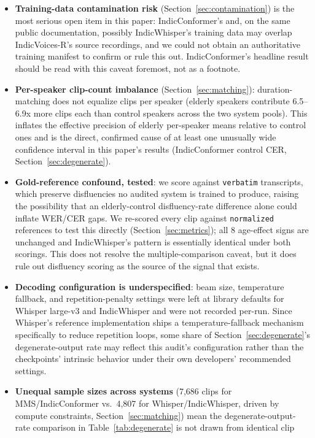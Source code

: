 \documentclass[11pt]{article}
\begin{document}
\begin{itemize}
\item \textbf{Training-data contamination risk} (Section~\ref{sec:contamination}) is the most
serious open item in this paper: IndicConformer's and, on the same public documentation, possibly
IndicWhisper's training data may overlap IndicVoices-R's source recordings, and we could not
obtain an authoritative training manifest to confirm or rule this out. IndicConformer's headline
result should be read with this caveat foremost, not as a footnote.
\item \textbf{Per-speaker clip-count imbalance} (Section~\ref{sec:matching}): duration-matching
does not equalize clips per speaker (elderly speakers contribute 6.5--6.9x more clips each than
control speakers across the two system pools). This inflates the effective precision of elderly
per-speaker means relative to control ones and is the direct, confirmed cause of at least one
unusually wide confidence interval in this paper's results (IndicConformer control CER,
Section~\ref{sec:degenerate}).
\item \textbf{Gold-reference confound, tested}: we score against \texttt{verbatim} transcripts,
which preserve disfluencies no audited system is trained to produce, raising the possibility that
an elderly-control disfluency-rate difference alone could inflate WER/CER gaps. We re-scored every
clip against \texttt{normalized} references to test this directly (Section~\ref{sec:metrics}); all
8 age-effect signs are unchanged and IndicWhisper's pattern is essentially identical under both
scorings. This does not resolve the multiple-comparison caveat, but it does rule out disfluency
scoring as the source of the signal that exists.
\item \textbf{Decoding configuration is underspecified}: beam size, temperature fallback, and
repetition-penalty settings were left at library defaults for Whisper large-v3 and IndicWhisper
and were not recorded per-run. Since Whisper's reference implementation ships a temperature-fallback
mechanism specifically to reduce repetition loops, some share of Section~\ref{sec:degenerate}'s
degenerate-output rate may reflect this audit's configuration rather than the checkpoints'
intrinsic behavior under their own developers' recommended settings.
\item \textbf{Unequal sample sizes across systems} (7,686 clips for MMS/IndicConformer vs.\ 4,807
for Whisper/IndicWhisper, driven by compute constraints, Section~\ref{sec:matching}) mean the
degenerate-output-rate comparison in Table~\ref{tab:degenerate} is not drawn from identical clip

\end{itemize}
\end{document}
